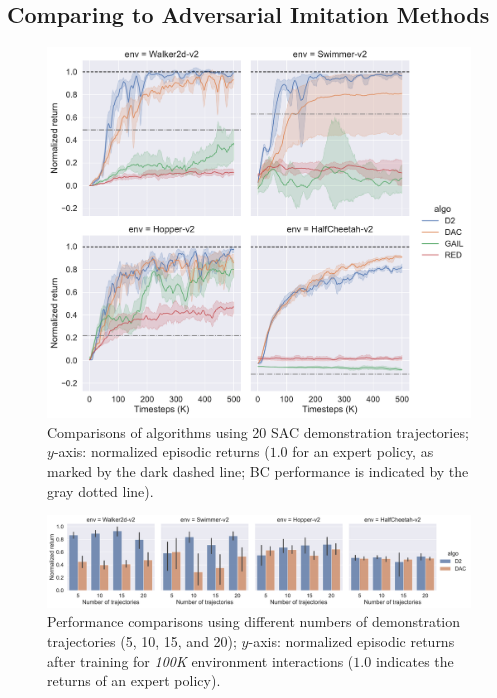 \documentclass[letterpaper]{article} %
\begin{document}
\subsection{Comparing to Adversarial Imitation Methods}
\begin{figure}
    \centering
    \includegraphics[width=0.9\linewidth]{comparison_adversarial.pdf}
    \caption{Comparisons of algorithms using 20 SAC demonstration trajectories; $y$-axis: normalized episodic returns ($1.0$ for an expert policy, as marked by the dark dashed line; BC performance is indicated by the gray dotted line). }
    \label{fig:comparison-with-adversarial}
\end{figure}

\begin{figure}
    \centering
    \includegraphics[width=0.85\linewidth]{traj-num.pdf}
    \caption{Performance comparisons using different numbers of demonstration trajectories (5, 10, 15, and 20);
    $y$-axis: normalized episodic returns after training for \textit{100K} environment interactions ($1.0$ indicates the returns of an expert policy).}
    \label{fig:comparison-num-traj}
\end{figure}
\end{document}
